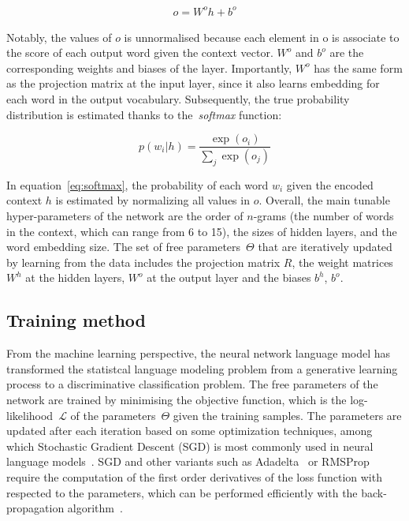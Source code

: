 \begin{equation}
\begin{aligned}
o = W^o h + b^o
\label{eq:linearoutput}
\end{aligned}  
\end{equation}

Notably, the values of $o$ is unnormalised because each element in o is associate to the score of each output word given the context vector. $W^o$ and $b^o$ are the corresponding weights and biases of the layer. Importantly, $W^o$ has the same form as the projection matrix at the input layer, since it also learns embedding for each word in the output vocabulary. Subsequently, the true probability distribution is estimated thanks to the~\textit{softmax} function:

\begin{equation}
p(w_i | h) = \frac{\exp(o_i)}{\sum_j \exp(o_j)}
\label{eq:softmax}
\end{equation}

In equation~\ref{eq:softmax}, the probability of each word $w_i$ given the encoded context $h$ is estimated by normalizing all values in $o$. Overall, the main tunable hyper-parameters of the network are the order of $n$-grams (the number of words in the context, which can range from 6 to 15), the sizes of hidden layers, and the word embedding size. The set of free parameters~$\Theta$ that are iteratively updated by learning from the data includes the projection matrix $R$, the weight matrices $W^h$ at the hidden layers, $W^o$ at the output layer and the biases $b^h$, $b^o$. 


\subsection{Training method}
From the machine learning perspective, the neural network language model has transformed the statistcal language modeling problem from a generative learning process to a discriminative classification problem. The free parameters of the network are trained by minimising the objective function, which is the log-likelihood~$\mathcal{L}$ of the  parameters~$\Theta$ given the training samples. The parameters are updated after each iteration based on some optimization techniques, among which Stochastic Gradient Descent (SGD) is most commonly used in neural language models~\cite{zaremba2014recurrent,le2011structured,mikolov2010recurrent}. SGD and other variants such as Adadelta~\cite{zeiler2012adadelta} or RMSProp~\cite{tieleman2012lecture} require the computation of the first order derivatives of the loss function with respected to the parameters, which can be performed efficiently with the back-propagation algorithm~\cite{le1990handwritten}.

